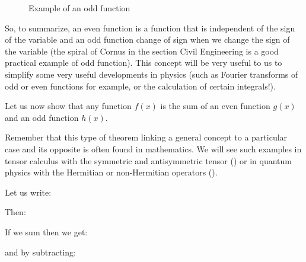 \begin{enumerate}
\begin{figure}[H]
			\vspace*{3mm}
			\caption{Example of an odd function}
		\end{figure}
		So, to summarize, an even function is a function that is independent of the sign of the variable and an odd function change of sign when we change the sign of the variable (the spiral of Cornus in the section Civil Engineering is a good practical example of odd function). This concept will be very useful to us to simplify some very useful developments in physics (such as Fourier transforms of odd or even functions for example, or the calculation of certain integrals!).
		\begin{theorem}
		Let us now show that any function $f(x)$ is the sum of an even function $g(x)$ and an odd function $h(x)$.
		
		\begin{tcolorbox}[title=Remark,arc=10pt,breakable,drop lifted shadow,
  skin=enhanced,
  skin first is subskin of={enhancedfirst}{arc=10pt,no shadow},
  skin middle is subskin of={enhancedmiddle}{arc=10pt,no shadow},
  skin last is subskin of={enhancedlast}{drop lifted shadow}]
		Remember that this type of theorem linking a general concept to a particular case and its opposite is often found in mathematics. We will see such examples in tensor calculus with the symmetric and antisymmetric tensor () or in quantum physics with the Hermitian or non-Hermitian operators ().
		\end{tcolorbox}	
		\end{theorem}
		\begin{dem}
		Let us write:
		
		Then:
		
		If we sum then we get:
		
		and by subtracting:
		

\end{dem}
\end{enumerate}
